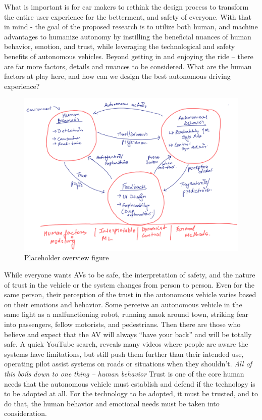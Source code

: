 What is important is for car makers to rethink the design process to transform the entire user experience for the betterment, and safety of everyone. 
With that in mind - the goal of the proposed research is to utilize both human, and machine advantages to humanize autonomy by instilling the beneficial nuances of human behavior, emotion, and trust, while leveraging the technological and safety benefits of autonomous vehicles.
Beyond getting in and enjoying the ride – there are far more factors, details and nuances to be considered. 
What are the human factors at play here, and how can we design the best autonomous driving experience?

\begin{figure}
    \centering
    \includegraphics[width=0.6\columnwidth]{figures/overview.png}
    \caption{Placeholder overview figure}
    \label{fig:overview}
\end{figure}



While everyone wants AVs to be safe, the interpretation of safety, and the nature of trust in the vehicle or the system changes from person to person.
Even for the same person, their perception of the trust in the autonomous vehicle varies based on their emotions and behavior.
Some perceive an autonomous vehicle in the same light as a malfunctioning robot, running amok around town, striking fear into passengers, fellow motorists, and pedestrians.
Then there are those who believe and expect that the AV will always ``have your back'' and will be totally safe.
A quick YouTube search, reveals many videos where people are aware the systems have limitations, but still push them further than their intended use, operating pilot assist systems on roads or situations when they shouldn't.
\textit{All of this boils down to one thing – human behavior}
Trust is one of the core human needs that the autonomous vehicle must establish and defend if the technology is to be adopted at all.
For the technology to be adopted, it must be trusted, and to do that, the human behavior and emotional needs must be taken into consideration. 


